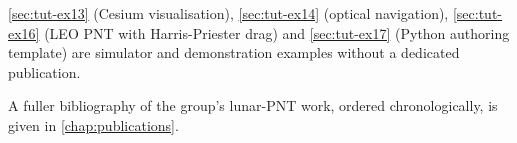 \begin{lupntnote}
\cref{sec:tut-ex13} (Cesium visualisation), \cref{sec:tut-ex14} (optical
navigation), \cref{sec:tut-ex16} (LEO PNT with Harris-Priester drag) and
\cref{sec:tut-ex17} (Python authoring template) are simulator and demonstration
examples without a dedicated publication.
\end{lupntnote}

A fuller bibliography of the group's lunar-PNT work, ordered chronologically, is
given in \cref{chap:publications}.
